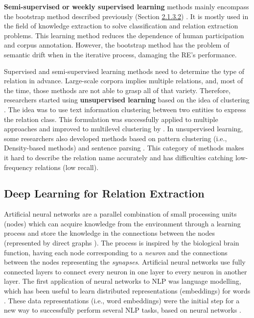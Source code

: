 \textbf{Semi-supervised or weekly supervised learning} methods mainly encompass the bootstrap method described previously (Section \hyperlink{2.1.3.2}{2.1.3.2}) \citep{hoffmann2011knowledge,augenstein2015extracting}. It is mostly used in the field of knowledge extraction to solve classification and relation extraction problems. 
This learning method reduces the dependence of human participation and corpus annotation. However, the bootstrap method has the problem of semantic drift when in the iterative process, damaging the RE's performance.

Supervised and semi-supervised learning methods need to determine the type of relation in advance. Large-scale corpora implies multiple relations, and, most of the time, those methods are not able to grasp all of that variety. Therefore, researchers started using \textbf{unsupervised learning} based on the idea of clustering \citep{hasegawa2004discovering,shinyama2006preemptive}. 
The idea was to use text information clustering between two entities to express the relation class. This formulation was successfully applied to multiple approaches and improved to multilevel clustering by \cite{shinyama2006preemptive}. In unsupervised learning, some researchers also developed methods based on pattern clustering (i.e., Density-based methods) and sentence parsing \citep{quan2014unsupervised}. 
This category of methods makes it hard to describe the relation name accurately and has difficulties catching low-frequency relations (low recall).


\hypertarget{2.1.4}{\subsection{Deep Learning for Relation Extraction}}

Artificial neural networks are a parallel combination of small processing units (nodes) which can acquire knowledge from the environment through a learning process and store the knowledge in the connections between the nodes \citep{haykin1994neural} (represented by direct graphs \citep{guresen2011definition}). The process is inspired by the biological brain function, having each node corresponding to a \textit{neuron} and the connections between the nodes representing the \textit{synapses}. Artificial neural networks use fully connected layers to connect every neuron in one layer to every neuron in another layer. 
The first application of neural networks to NLP was language modelling, which has been useful to learn distributed representations (embeddings) for words \citep{bengio2003neural,mikolov2013distributed}. These data representations (i.e., word embeddings) were the initial step for a new way to successfully perform several NLP tasks, based on neural networks \citep{nguyen2015relation}.  


